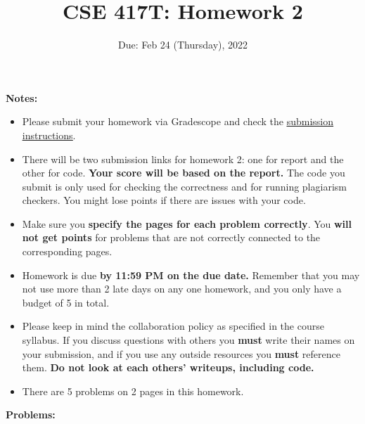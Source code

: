 \documentclass[11pt]{article}
\begin{document}
\title{CSE 417T: Homework 2}
\date{Due: Feb 24 (Thursday), 2022}

\maketitle

\noindent \textbf{Notes: } 
\begin{itemize}

\item Please submit your homework via Gradescope and check the \href{http://chienjuho.com/courses/cse417t/hw_instructions.html}{\underline{submission instructions}}.

\item There will be two submission links for homework 2: one for report and the other for code. \textbf{Your score will be based on the report.} The code you submit is only used for checking the correctness and for running plagiarism checkers. You might lose points if there are issues with your code.

\item Make sure you \textbf{specify the pages for each problem correctly}. You \textbf{will not get points} for problems that are not correctly connected to the corresponding pages.

\item Homework is due \textbf{by 11:59 PM on the due date.} Remember that
  you may not use more than 2 late days on any one homework, and you
  only have a budget of 5 in total.

\item Please keep in mind the collaboration policy as specified in the
  course syllabus. If you discuss questions with 
others you \textbf{must} write their names on your submission, and if
you use any outside resources you \textbf{must} reference
them. \textbf{Do not look at each others' writeups, including code.}

\item There are 5 problems on 2 pages in this homework. 

\end{itemize}

\noindent \textbf{Problems:}
\end{document}
